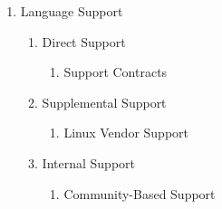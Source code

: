 \begin{enumerate}
        \item Language Support
        \begin{enumerate}
                \item Direct Support
                \begin{enumerate}
                        \item Support Contracts
                \end{enumerate}
                \item Supplemental Support
                \begin{enumerate}
                        \item Linux Vendor Support
                \end{enumerate}
                \item Internal Support
                \begin{enumerate}
                        \item Community-Based Support
                \end{enumerate}
        \end{enumerate} %

\end{enumerate} %